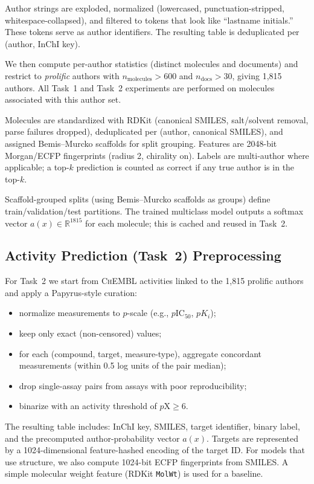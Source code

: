 \documentclass[11pt]{article}
\begin{document}
Author strings are exploded, normalized (lowercased, punctuation-stripped, whitespace-collapsed), and filtered to tokens that look like ``lastname initials.'' These tokens serve as author identifiers. The resulting table is deduplicated per (author, InChI key).

We then compute per-author statistics (distinct molecules and documents) and restrict to \emph{prolific} authors with $n_{\text{molecules}}>600$ and $n_{\text{docs}}>30$, giving 1,815 authors. All Task~1 and Task~2 experiments are performed on molecules associated with this author set.

Molecules are standardized with RDKit (canonical SMILES, salt/solvent removal, parse failures dropped), deduplicated per (author, canonical SMILES), and assigned Bemis--Murcko scaffolds for split grouping. Features are 2048-bit Morgan/ECFP fingerprints (radius 2, chirality on). Labels are multi-author where applicable; a top-$k$ prediction is counted as correct if any true author is in the top-$k$.

Scaffold-grouped splits (using Bemis--Murcko scaffolds as groups) define train/validation/test partitions. The trained multiclass model outputs a softmax vector $a(x)\in\mathbb{R}^{1815}$ for each molecule; this is cached and reused in Task~2.

\subsection{Activity Prediction (Task~2) Preprocessing}\label{app:task2-pre}

For Task~2 we start from \textsc{ChEMBL} activities linked to the 1,815 prolific authors and apply a Papyrus-style curation:

\begin{itemize}[leftmargin=1.5em,itemsep=0.25em]
  \item normalize measurements to $p$-scale (e.g., $p\mathrm{IC}_{50}$, $pK_i$);
  \item keep only exact (non-censored) values;
  \item for each (compound, target, measure-type), aggregate concordant measurements (within 0.5 log units of the pair median);
  \item drop single-assay pairs from assays with poor reproducibility;
  \item binarize with an activity threshold of $p\mathrm{X}\ge 6$.
\end{itemize}

The resulting table includes: InChI key, SMILES, target identifier, binary label, and the precomputed author-probability vector $a(x)$. Targets are represented by a 1024-dimensional feature-hashed encoding of the target ID. For models that use structure, we also compute 1024-bit ECFP fingerprints from SMILES. A simple molecular weight feature (RDKit \texttt{MolWt}) is used for a baseline.
\end{document}

